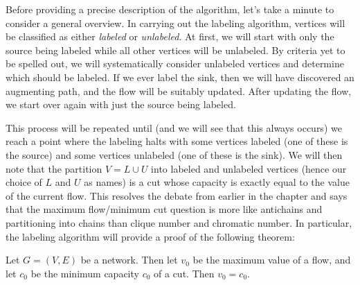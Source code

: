 Before providing a precise description of the algorithm, let's take a
minute to consider a general overview. In carrying out the labeling
algorithm, vertices will be classified as either \textit{labeled} or
\textit{unlabeled}.  At first, we will start with only the source
being labeled while all other vertices will be unlabeled.  By criteria
yet to be spelled out, we will systematically consider unlabeled
vertices and determine which should be labeled.  If we ever label the
sink, then we will have discovered an augmenting path, and the flow
will be suitably updated. After updating the flow, we start over again
with just the source being labeled.

This process will be repeated until (and we will see that this always
occurs) we reach a point where the labeling halts with some vertices
labeled (one of these is the source) and some vertices unlabeled (one
of these is the sink).  We will then note that the partition $V= L\cup
U$ into labeled and unlabeled vertices (hence our choice of $L$ and
$U$ as names) is a cut whose capacity is exactly equal to the value of
the current flow. This resolves the debate from earlier in the chapter
and says that the maximum flow/minimum cut question is more like
antichains and partitioning into chains than clique number and
chromatic number. In particular, the labeling algorithm will provide a
proof of the following theorem:

\begin{theorem}
  Let $G=(V,E)$ be a network.  Then let $v_0$ be the maximum value of
  a flow, and let $c_0$ be the minimum capacity $c_0$ of a cut.  Then
  $v_0=c_0$.
\end{theorem}


